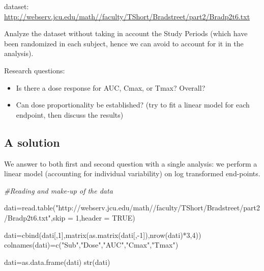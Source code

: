 \documentclass[
]{article}
\newenvironment{Shaded}{\begin{snugshade}}{\end{snugshade}}
\newcommand{\AttributeTok}[1]{\textcolor[rgb]{0.77,0.63,0.00}{#1}}
\newcommand{\CommentTok}[1]{\textcolor[rgb]{0.56,0.35,0.01}{\textit{#1}}}
\newcommand{\ConstantTok}[1]{\textcolor[rgb]{0.00,0.00,0.00}{#1}}
\newcommand{\DecValTok}[1]{\textcolor[rgb]{0.00,0.00,0.81}{#1}}
\newcommand{\FunctionTok}[1]{\textcolor[rgb]{0.00,0.00,0.00}{#1}}
\newcommand{\NormalTok}[1]{#1}
\newcommand{\OtherTok}[1]{\textcolor[rgb]{0.56,0.35,0.01}{#1}}
\newcommand{\SpecialCharTok}[1]{\textcolor[rgb]{0.00,0.00,0.00}{#1}}
\newcommand{\StringTok}[1]{\textcolor[rgb]{0.31,0.60,0.02}{#1}}
\providecommand{\tightlist}{%
  \setlength{\itemsep}{0pt}\setlength{\parskip}{0pt}}
\begin{document}
dataset:\\
\url{http://webserv.jcu.edu/math//faculty/TShort/Bradstreet/part2/Bradp2t6.txt}

Analyze the dataset without taking in account the Study Periods (which
have been randomized in each subject, hence we can avoid to account for
it in the analysis).

Research questions:

\begin{itemize}
\tightlist
\item
  Is there a dose response for AUC, Cmax, or Tmax? Overall?
\item
  Can dose proportionality be established? (try to fit a linear model
  for each endpoint, then discuss the results)
\end{itemize}

\hypertarget{a-solution}{%
\subsection{A solution}\label{a-solution}}

We answer to both first and second question with a single analysis: we
perform a linear model (accounting for individual variability) on log
transformed end-points.

\begin{Shaded}
\begin{Highlighting}[]
\CommentTok{\#Reading and make{-}up of the data}

\NormalTok{dati}\OtherTok{=}\FunctionTok{read.table}\NormalTok{(}\StringTok{"http://webserv.jcu.edu/math//faculty/TShort/Bradstreet/part2/Bradp2t6.txt"}\NormalTok{,}\AttributeTok{skip =} \DecValTok{1}\NormalTok{,}\AttributeTok{header =} \ConstantTok{TRUE}\NormalTok{)}

\NormalTok{dati}\OtherTok{=}\FunctionTok{cbind}\NormalTok{(dati[,}\DecValTok{1}\NormalTok{],}\FunctionTok{matrix}\NormalTok{(}\FunctionTok{as.matrix}\NormalTok{(dati[,}\SpecialCharTok{{-}}\DecValTok{1}\NormalTok{]),}\FunctionTok{nrow}\NormalTok{(dati)}\SpecialCharTok{*}\DecValTok{3}\NormalTok{,}\DecValTok{4}\NormalTok{))}
\FunctionTok{colnames}\NormalTok{(dati)}\OtherTok{=}\FunctionTok{c}\NormalTok{(}\StringTok{"Sub"}\NormalTok{,}\StringTok{"Dose"}\NormalTok{,}\StringTok{"AUC"}\NormalTok{,}\StringTok{"Cmax"}\NormalTok{,}\StringTok{"Tmax"}\NormalTok{)}

\NormalTok{dati}\OtherTok{=}\FunctionTok{as.data.frame}\NormalTok{(dati)}
\FunctionTok{str}\NormalTok{(dati)}
\end{Highlighting}
\end{Shaded}
\end{document}
